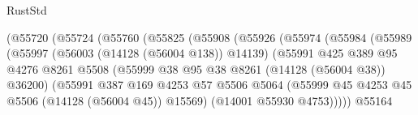 \begin{lexlean}{RustStd}
\begin{coremodule}
                                    (@55720
                                      (@55724
                                        (@55760
                                          (@55825
                                            (@55908
                                              (@55926
                                                (@55974
                                                  (@55984
                                                    (@55989
                                                      (@55997
                                                        (@56003 (@14128 (@56004 @138)) @14139)
                                                        (@55991
                                                          @425
                                                          @389
                                                          @95
                                                          @4276
                                                          @8261
                                                          @5508
                                                          (@55999
                                                            @38
                                                            @95
                                                            @38
                                                            @8261
                                                            (@14128 (@56004 @38))
                                                            @36200)
                                                          (@55991
                                                            @387
                                                            @169
                                                            @4253
                                                            @57
                                                            @5506
                                                            @5064
                                                            (@55999
                                                              @45
                                                              @4253
                                                              @45
                                                              @5506
                                                              (@14128 (@56004 @45))
                                                              @15569)
                                                            (@14001 @55930 @4753)))))
                                                    @55164

\end{coremodule}
\end{lexlean}
